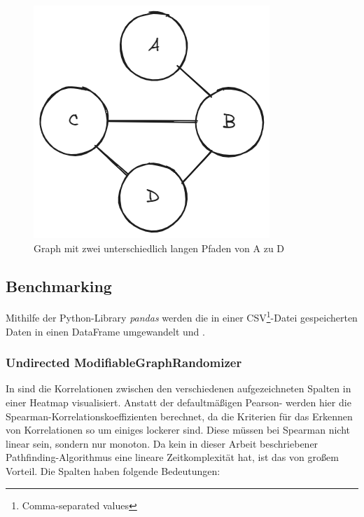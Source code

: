                 \begin{figure}
                    \centering
                    \includegraphics[width=0.5\linewidth]{images/abcd.png}
                    \caption{Graph mit zwei unterschiedlich langen Pfaden von A zu D}
                    \label{fig:abcd}
                \end{figure}
        
        \subsection{Benchmarking}

            Mithilfe der Python-Library \emph{pandas} werden die in einer CSV\footnote{Comma-separated values}-Datei gespeicherten Daten in einen DataFrame umgewandelt und . %
            
            \subsubsection{Undirected ModifiableGraphRandomizer}

                In  sind die Korrelationen zwischen den verschiedenen aufgezeichneten Spalten in einer Heatmap visualisiert. Anstatt der defaultmäßigen Pearson- werden hier die Spearman-Korrelationskoeffizienten berechnet, da die Kriterien für das Erkennen von Korrelationen so um einiges lockerer sind. Diese müssen bei Spearman nicht linear sein, sondern nur monoton. Da kein in dieser Arbeit beschriebener Pathfinding-Algorithmus eine lineare Zeitkomplexität hat, ist das von großem Vorteil. Die Spalten haben folgende Bedeutungen:

